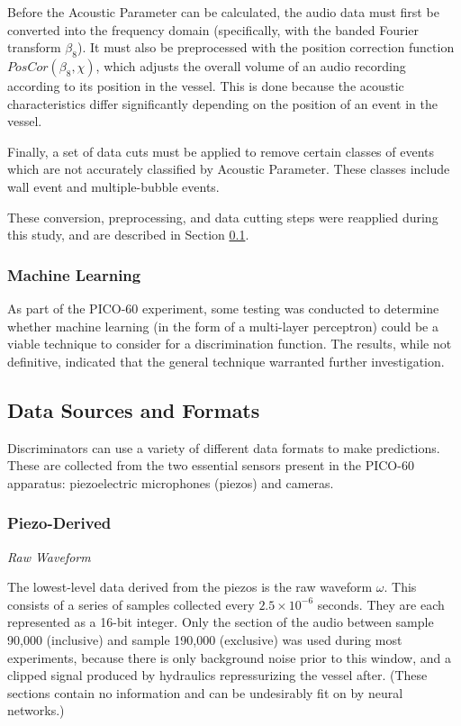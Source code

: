\documentclass[10pt]{article}
\begin{document}
Before the Acoustic Parameter can be calculated, the audio data must first be converted into the frequency domain (specifically, with the banded Fourier transform $\beta_{8}$). It must also be preprocessed with the position correction function $PosCor(\beta_{8}, \chi)$, which adjusts the overall volume of an audio recording according to its position in the vessel. This is done because the acoustic characteristics differ significantly depending on the position of an event in the vessel.

Finally, a set of data cuts must be applied to remove certain classes of events which are not accurately classified by Acoustic Parameter. These classes include wall event and multiple-bubble events.

These conversion, preprocessing, and data cutting steps were reapplied during this study, and are described in Section \ref{data_formats}.

\subsubsection{Machine Learning}

As part of the PICO-60 experiment, some testing was conducted to determine whether machine learning (in the form of a multi-layer perceptron) could be a viable technique to consider for a discrimination function. The results, while not definitive, indicated that the general technique warranted further investigation.

\subsection{Data Sources and Formats} \label{data_formats}

Discriminators can use a variety of different data formats to make predictions. These are collected from the two essential sensors present in the PICO-60 apparatus: piezoelectric microphones (piezos) and cameras.

\subsubsection{Piezo-Derived}

\textit{Raw Waveform}

The lowest-level data derived from the piezos is the raw waveform $\omega$. This consists of a series of samples collected every $2.5 \times 10^{-6}$ seconds. They are each represented as a 16-bit integer. Only the section of the audio between sample 90,000 (inclusive) and sample 190,000 (exclusive) was used during most experiments, because there is only background noise prior to this window, and a clipped signal produced by hydraulics repressurizing the vessel after. (These sections contain no information and can be undesirably fit on by neural networks.)
\end{document}
